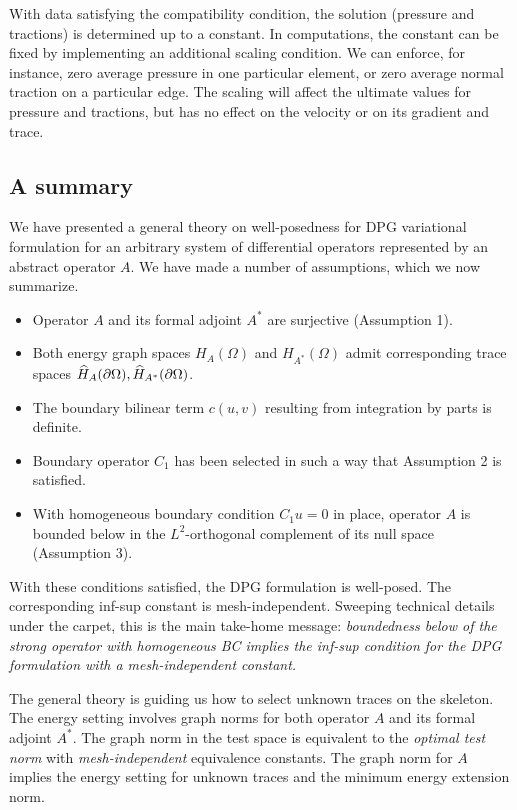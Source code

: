 With data satisfying the compatibility condition, the solution (pressure and tractions) is determined
up to a constant. In computations, the constant can be fixed by implementing an additional scaling
condition. We can enforce, for instance, zero average pressure in one particular element, or zero
average normal traction on a particular edge. The scaling will affect the ultimate values for pressure
and tractions, but has no effect on the velocity or on its gradient and trace.

\subsection{A summary}

We have presented a general theory on well-posedness for DPG variational formulation for an arbitrary
system of differential operators represented by an abstract operator $A$. 
We have made a number of assumptions, which we now summarize.
\begin{itemize}
  \item Operator $A$ and its formal adjoint $A^\ast$ are surjective ({Assumption 1}).
  \item Both energy graph spaces $H_A(\Omega)$ and $H_{A^\ast}(\Omega)$ admit corresponding
trace spaces $\widehat{H}_A(\ptl \Omega),\widehat{H}_{A^\ast}(\ptl \Omega)$.
  \item The boundary bilinear term $c(u,v)$ resulting from integration by parts is definite. 
  \item Boundary operator $C_1$ has been selected in such a way that {Assumption 2}
 is satisfied.
  \item With homogeneous boundary condition $C_1 u = 0$ in place, operator $A$ is bounded below
in the $L^2$-orthogonal complement of its null space ({Assumption 3}).
\end{itemize}
With these conditions satisfied, the DPG formulation is well-posed. The corresponding inf-sup constant
is mesh-independent.
Sweeping technical details under the carpet, this is the main
take-home message: {\em boundedness below of the strong operator with homogeneous BC implies
the inf-sup condition for the DPG formulation with a mesh-independent constant.}

The general theory is guiding us how to select unknown traces on the skeleton.
The energy setting involves graph norms for both operator $A$ and its formal adjoint $A^{\ast}$. The graph norm
in the test space is equivalent to the {\em optimal test norm} \cite{DPG4} with {\em mesh-independent} 
equivalence constants. The graph norm for $A$ implies the energy setting for unknown traces and
the minimum energy extension norm.

